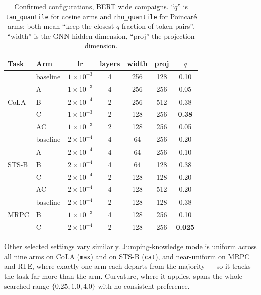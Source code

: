 \documentclass{article}
\begin{document}
\begin{table}[h]
\caption{Confirmed configurations, BERT wide campaigns. ``$q$'' is
\texttt{tau\_quantile} for cosine arms and \texttt{rho\_quantile} for Poincar\'e
arms; both mean ``keep the closest $q$ fraction of token pairs''. ``width'' is
the GNN hidden dimension, ``proj'' the projection dimension.}
\label{tab:hp}
\begin{center}
\small
\begin{tabular}{llccccc}
\toprule
Task & Arm & lr & layers & width & proj & $q$ \\
\midrule
\multirow{5}{*}{CoLA}
 & baseline & $1{\times}10^{-3}$ & 4 & 256 & 128 & 0.10 \\
 & A        & $1{\times}10^{-3}$ & 4 & 256 & 256 & 0.05 \\
 & B        & $2{\times}10^{-4}$ & 2 & 256 & 512 & 0.38 \\
 & C        & $1{\times}10^{-3}$ & 2 & 128 & 256 & \textbf{0.38} \\
 & AC       & $1{\times}10^{-3}$ & 2 & 128 & 256 & 0.05 \\
\midrule
\multirow{5}{*}{STS-B}
 & baseline & $2{\times}10^{-4}$ & 4 & \phantom{0}64 & 256 & 0.20 \\
 & A        & $2{\times}10^{-4}$ & 4 & \phantom{0}64 & 256 & 0.10 \\
 & B        & $2{\times}10^{-4}$ & 4 & \phantom{0}64 & 128 & 0.38 \\
 & C        & $2{\times}10^{-4}$ & 2 & 128 & 128 & 0.20 \\
 & AC       & $2{\times}10^{-4}$ & 4 & 128 & 512 & 0.20 \\
\midrule
\multirow{3}{*}{MRPC}
 & baseline & $2{\times}10^{-4}$ & 2 & 128 & 128 & 0.38 \\
 & B        & $1{\times}10^{-3}$ & 4 & 128 & 256 & 0.10 \\
 & C        & $2{\times}10^{-4}$ & 2 & 128 & 256 & \textbf{0.025} \\
\bottomrule
\end{tabular}
\end{center}
\end{table}

Other selected settings vary similarly. Jumping-knowledge mode is uniform across
all nine arms on CoLA (\texttt{max}) and on STS-B (\texttt{cat}), and
near-uniform on MRPC and RTE, where exactly one arm each departs from the
majority --- so it tracks the task far more than the arm. Curvature, where it
applies, spans the whole searched range $\{0.25, 1.0, 4.0\}$ with no consistent
preference.
\end{document}
